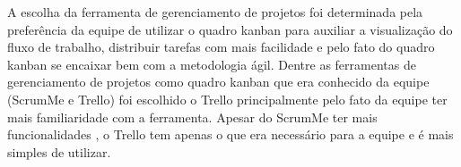 A escolha da ferramenta de gerenciamento de projetos foi determinada pela preferência da equipe de utilizar o quadro kanban para auxiliar a visualização do fluxo de trabalho, distribuir tarefas com mais facilidade e pelo fato do quadro kanban se encaixar bem com a metodologia ágil. \cite{kanban2001} Dentre as ferramentas de gerenciamento de projetos como quadro kanban que era conhecido da equipe (ScrumMe e Trello) foi escolhido o Trello principalmente pelo fato da equipe ter mais familiaridade com a ferramenta. Apesar do ScrumMe ter mais funcionalidades \cite{scrum2013}, o Trello tem apenas o que era necessário para a equipe e é mais simples de utilizar.

